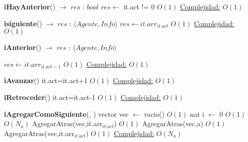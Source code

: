     \begin{algorithm}[H]	
        \begin{algorithmic}[1]
            \State \textbf{iHayAnterior}() $\to$ $res$ : $bool$
            \State $res \gets$ it.act != 0	\Comment $O(1)$
            \Statex \underline{Complejidad:} $O(1)$
        \end{algorithmic}
    \end{algorithm}
    \begin{algorithm}[H]
        \begin{algorithmic}[1]
           \State \textbf{isiguiente}() $\to$ $res$ : $\langle Agente,Info \rangle$
            \State $res \gets it.arr_{it.act}$	\Comment $O(1)$
            \Statex \underline{Complejidad:} $O(1)$
        \end{algorithmic}
    \end{algorithm}
    \begin{algorithm}[H]{\textbf{iAnterior}() $\to$ $res$ : $\langle Agente,Info \rangle$}
        \begin{algorithmic}[1]	
            \State $res \gets it.arr_{it.act - 1}$	\Comment $O(1)$
            \Statex \underline{Complejidad:} $O(1)$
        \end{algorithmic}
    \end{algorithm}
    \begin{algorithm}[H]
        \begin{algorithmic}[1]
            \State \textbf{iAvanzar}()
            \State it.act=it.act+1	\Comment $O(1)$
            \Statex \underline{Complejidad:} $O(1)$
        \end{algorithmic}
    \end{algorithm}
    \begin{algorithm}[H]
        \begin{algorithmic}[1]
            \State \textbf{iRetroceder}()
            \State it.act=it.act-1	\Comment $O(1)$
            \Statex \underline{Complejidad:} $O(1)$
        \end{algorithmic}
    \end{algorithm}
    \begin{algorithm}[H]
        \begin{algorithmic}[1]
            \State \textbf{iAgregarComoSiguiente}(, )
         		\State vector vec $\gets$ vacio() \Comment $O(1)$
                \State nat i $\gets$ 0 \Comment $O(1)$
                	\Comment $O(N_{a})$
                    	\State AgregarAtras(vec,it.arr$_{it.act}$)	\Comment $O(1)$
                        \State AgregarAtras(vec,a)	\Comment $O(1)$
                    \Else
                    	\State AgregarAtras(vec,it.arr$_{it.act}$)	\Comment $O(1)$
                    \EndIf
	     		\EndWhile
            	\Statex \underline{Complejidad:} $O(N_{a})$
    	\end{algorithmic}
    \end{algorithm}    	